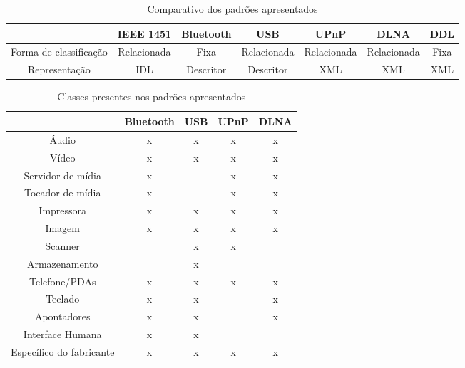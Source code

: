 \begin{table}
	\caption{Comparativo dos padrões apresentados}
	\begin{center}
	\resizebox{16cm}{!} {
		\begin{tabular}{ccccccc}
		\hline
							& \textbf{IEEE 1451}	& \textbf{Bluetooth} 	& \textbf{USB}	& \textbf{UPnP} & \textbf{DLNA} & \textbf{DDL}\\
		\hline
		Forma de classificação 		& Relacionada 			& Fixa 					& Relacionada 	& Relacionada 	& Relacionada 	& Fixa \\
		\hline
		Representação 		& IDL 					& Descritor				& Descritor		& XML			& XML 			& XML \\ 
		\hline
		\end{tabular}
	}
	\end{center}
	\label{tab:comparativo}
\end{table}

\begin{table}
	\caption{Classes presentes nos padrões apresentados}
	\begin{center}
		\begin{tabular}{|ccccc|}
		\hline
									& \textbf{Bluetooth} 	& \textbf{USB}	& \textbf{UPnP} & \textbf{DLNA}	\\
		\hline
		Áudio						& x						& x				& x 			& x				\\
		\hline
		Vídeo						& x						& x				& x				& x				\\
		\hline
		Servidor de mídia			& x						&				& x 			& x				\\
		\hline
		Tocador de mídia			& x						&				& x				& x				\\
		\hline
		Impressora 					& x						& x				& x				& x				\\
		\hline
		Imagem	 					& x						& x				& x				& x				\\
		\hline
		Scanner						& 						& x				& x				& 				\\
		\hline
		Armazenamento				&						& x				& 				& 				\\	
		\hline
		Telefone/PDAs				& x						& x				& x				& x				\\
		\hline
		Teclado						& x						& x				& 				& x				\\
		\hline
		Apontadores					& x						& x				& 				& x 			\\
		\hline
		Interface Humana		 	& x						& x				&  				&  				\\
		\hline
		Específico do fabricante 	& x 					& x				& x				& x				\\
		\hline								
		\end{tabular}
	\end{center}
	\label{tab:comparativoClasses}
\end{table}


